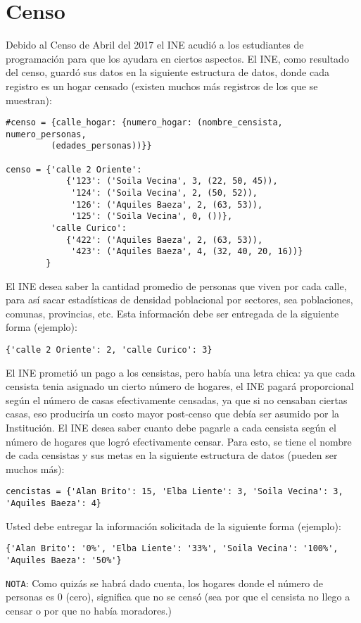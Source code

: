 \section{Censo}

Debido al Censo de Abril del 2017 el INE acudió a los estudiantes de programación para que los ayudara en ciertos aspectos. El INE, como resultado del censo, guardó sus datos en la siguiente estructura de datos, donde cada registro es un hogar censado (existen muchos más registros de los que se muestran):

\begin{lstlisting}[style=consola]
#censo = {calle_hogar: {numero_hogar: (nombre_censista, numero_personas,
         (edades_personas))}}

censo = {'calle 2 Oriente':
            {'123': ('Soila Vecina', 3, (22, 50, 45)), 
             '124': ('Soila Vecina', 2, (50, 52)),
             '126': ('Aquiles Baeza', 2, (63, 53)), 
             '125': ('Soila Vecina', 0, ())}, 
         'calle Curico':
            {'422': ('Aquiles Baeza', 2, (63, 53)),
             '423': ('Aquiles Baeza', 4, (32, 40, 20, 16))}
        }
\end{lstlisting}

El INE desea saber la cantidad promedio de personas que viven por cada calle, para así sacar estadísticas de densidad poblacional por sectores, sea poblaciones, comunas, provincias, etc. Esta información debe ser entregada de la siguiente forma (ejemplo):

\begin{lstlisting}[style=consola]
{'calle 2 Oriente': 2, 'calle Curico': 3}
\end{lstlisting}

El INE prometió un pago a los censistas, pero había una letra chica: ya que cada censista tenia asignado un cierto número de hogares, el INE pagará proporcional según el número de casas efectivamente censadas, ya que si no censaban ciertas casas, eso produciría un costo mayor post-censo que debía ser asumido por la Institución. El INE desea saber cuanto debe pagarle a cada censista según el número de hogares que logró efectivamente censar. Para esto, se tiene el nombre de cada censistas y sus metas en la siguiente estructura de datos (pueden ser muchos más):

\begin{lstlisting}[style=consola]
cencistas = {'Alan Brito': 15, 'Elba Liente': 3, 'Soila Vecina': 3, 
'Aquiles Baeza': 4}
\end{lstlisting}

Usted debe entregar la información solicitada de la siguiente forma (ejemplo):

\begin{lstlisting}[style=consola]
{'Alan Brito': '0%', 'Elba Liente': '33%', 'Soila Vecina': '100%', 
'Aquiles Baeza': '50%'}
\end{lstlisting}

\texttt{NOTA}: Como quizás se habrá dado cuenta, los hogares donde el número de personas es 0 (cero), significa que no se censó (sea por que el censista no llego a censar o por que no había moradores.)
